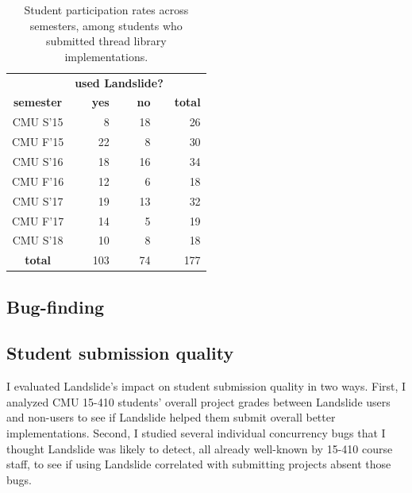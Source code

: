 \begin{table}[h]
	\begin{center}
		\begin{tabular}{c|crcrc|r}
			& \multicolumn{5}{c|}{\bf used Landslide?} & \\
			\bf semester & & \bf yes & & \bf no & & \bf total \\
			\hline
			CMU S'15	& &   8	& &  18	& &  26 \\
			CMU F'15	& &  22	& &   8	& &  30 \\
			CMU S'16	& &  18	& &  16	& &  34 \\
			CMU F'16	& &  12	& &   6	& &  18 \\
			CMU S'17	& &  19	& &  13	& &  32 \\
			CMU F'17	& &  14	& &   5	& &  19 \\
			CMU S'18	& &  10	& &   8	& &  18 \\
			\hline
			\bf total	& & 103	& &  74	& & 177 \\
		\end{tabular}
	\end{center}
	\caption{Student participation rates across semesters,
		among students who submitted thread library implementations.}
	\label{tab:photo-of-ze-studence}
\end{table}

\subsection{Bug-finding}
\label{sec:education-eval-bugfinding}

\subsection{Student submission quality}
\label{sec:education-eval-grades}

I evaluated Landslide's impact on student submission quality in two ways.
First, I analyzed CMU 15-410 students' overall project grades between Landslide users and non-users
to see if Landslide helped them submit overall better implementations.
Second, I studied
several %
individual concurrency bugs that I thought Landslide was likely to detect,
all already well-known by 15-410 course staff,
to see if using Landslide correlated with submitting projects absent those bugs.

